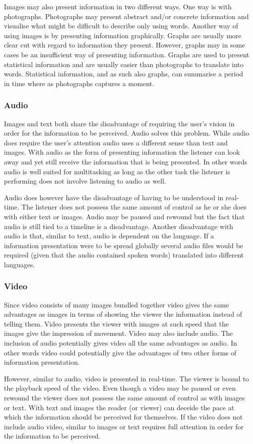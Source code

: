 Images may also present information in two different ways. One way is with photographs. Photographs may present abstract and/or concrete information and visualise what might be difficult to describe only using words. Another way of using images is by presenting information graphically. Graphs are usually more clear cut with regard to information they present. However, graphs may in some cases be an insufficient way of presenting information. Graphs are used to present statistical information and are usually easier than photographs to translate into words. Statistical information, and as such also graphs, can summarise a period in time where as photographs captures a moment. 

\subsubsection{Audio}
Images and text both share the disadvantage of requiring the user's vision in order for the information to be perceived. Audio solves this problem. While audio does require the user's attention audio uses a different sense than text and images. With audio as the form of presenting information the listener can look away and yet still receive the information that is being presented. In other words audio is well suited for multitasking as long as the other task the listener is performing does not involve listening to audio as well.

Audio does however have the disadvantage of having to be understood in real-time. The listener does not possess the same amount of control as he or she does with either text or images. Audio may be paused and rewound but the fact that audio is still tied to a timeline is a disadvantage. Another disadvantage with audio is that, similar to text, audio is dependent on the language. If a information presentation were to be spread globally several audio files would be required (given that the audio contained spoken words) translated into different languages.

\subsubsection{Video}
Since video consists of many images bundled together video gives the same advantages as images in terms of showing the viewer the information instead of telling them. Video presents the viewer with images at such speed that the images give the impression of movement. Video may also include audio. The inclusion of audio potentially gives video all the same advantages as audio. In other words video could potentially give the advantages of two other forms of information presentation.

However, similar to audio, video is presented in real-time. The viewer is bound to the playback speed of the video. Even though a video may be paused or even rewound the viewer does not possess the same amount of control as with images or text. With text and images the reader (or viewer) can deceide the pace at which the information should be perceived for themselves. If the video does not include audio video, similar to images or text requires full attention in order for the information to be perceived.